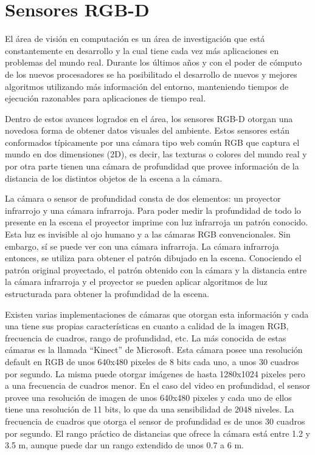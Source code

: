 \chapter{Sensores RGB-D}\label{sensores_rgbd}
El área de visión en computación es un área de investigación que está constantemente en desarrollo y la cual tiene cada vez más aplicaciones en problemas del mundo real. Durante los últimos años y con el poder de cómputo de los nuevos procesadores se ha posibilitado el desarrollo de nuevos y mejores algoritmos utilizando más información del entorno, manteniendo tiempos de ejecución razonables para aplicaciones de tiempo real.

Dentro de estos avances logrados en el área, los sensores RGB-D otorgan una novedosa forma de obtener datos visuales del ambiente. Estos sensores están conformados típicamente por una cámara tipo web común RGB que captura el mundo en dos dimensiones (2D), es decir, las texturas o colores del mundo real y por otra parte tienen una cámara de profundidad que provee información de la distancia de los distintos objetos de la escena a la cámara.

La cámara o sensor de profundidad consta de dos elementos: un proyector infrarrojo y una cámara infrarroja. Para poder medir la profundidad de todo lo presente en la escena el proyector imprime con luz infrarroja un patrón conocido. Esta luz es invisible al ojo humano y a las cámaras RGB convencionales. Sin embargo, sí se puede ver con una cámara infrarroja. La cámara infrarroja entonces, se utiliza para obtener el patrón dibujado en la escena. Conociendo el patrón original proyectado, el patrón obtenido con la cámara y la distancia entre la cámara infrarroja y el proyector se pueden aplicar algoritmos de luz estructurada para obtener la profundidad de la escena.

Existen varias implementaciones de cámaras que otorgan esta información y cada una tiene sus propias características en cuanto a calidad de la imagen RGB, frecuencia de cuadros, rango de profundidad, etc. La más conocida de estas cámaras es la llamada ``Kinect'' de Microsoft. Esta cámara posee una resolución default en RGB de unos 640x480 pixeles de 8 bits cada uno, a unos 30 cuadros por segundo. La misma puede otorgar imágenes de hasta 1280x1024 pixeles pero a una frecuencia de cuadros menor. En el caso del video en profundidad, el sensor provee una resolución de imagen de unos 640x480 pixeles y cada uno de ellos tiene una resolución de 11 bits, lo que da una sensibilidad de 2048 niveles. La frecuencia de cuadros que otorga el sensor de profundidad es de unos 30 cuadros por segundo. El rango práctico de distancias que ofrece la cámara está entre 1.2 y 3.5 m, aunque puede dar un rango extendido de unos 0.7 a 6 m.

